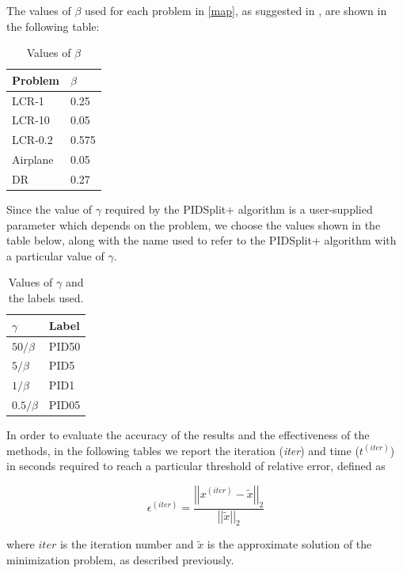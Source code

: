 The values of $\beta$ used for each problem in \eqref{map}, as suggested in \citep{zanella}, are shown in the following table:

\begin{table}[H]
\begin{center}
\renewcommand*{\arraystretch}{1.4}
\begin{tabular}{m{1.8cm}|m{1cm}}
Problem & $\beta$ \\
\hline
LCR-1 & 0.25 \\
\hline
LCR-10 & 0.05 \\
\hline
LCR-0.2 & 0.575 \\
\hline
Airplane & 0.05 \\
\hline
DR & 0.27 \\
\end{tabular}
\caption{Values of $\beta$}
\end{center}
\end{table}

Since the value of $\gamma$ required by the PIDSplit+ algorithm is a user-supplied parameter which depends on the problem, we choose the values shown in the table below, along with the name used to refer to the PIDSplit+ algorithm with a particular value of $\gamma$.

\begin{table}[H]
\begin{center}
\renewcommand*{\arraystretch}{1.8}
\begin{tabular}{C{0.8cm}|C{1cm}}
$\gamma$ & Label \\
\hline
$50/\beta$ & PID50 \\
\hline
$5/\beta$ & PID5 \\
\hline
$1/\beta$ & PID1 \\
\hline
$0.5/\beta$ & PID05 \\
\end{tabular}
\caption{Values of $\gamma$ and the labels used.}
\end{center}
\end{table}

In order to evaluate the accuracy of the results and the effectiveness of the methods, in the following tables we report the iteration (\emph{iter}) and time ($t^{(iter)}$) in seconds required to reach a particular threshold of relative error, defined as

$$\epsilon^{(iter)} = \dfrac{\left|\left|x^{(iter)}-\tilde{x}\right|\right|_2}{\left|\left|\tilde{x}\right|\right|_2}$$

where $iter$ is the iteration number and $\tilde{x}$ is the approximate solution of the minimization problem, as described previously.

